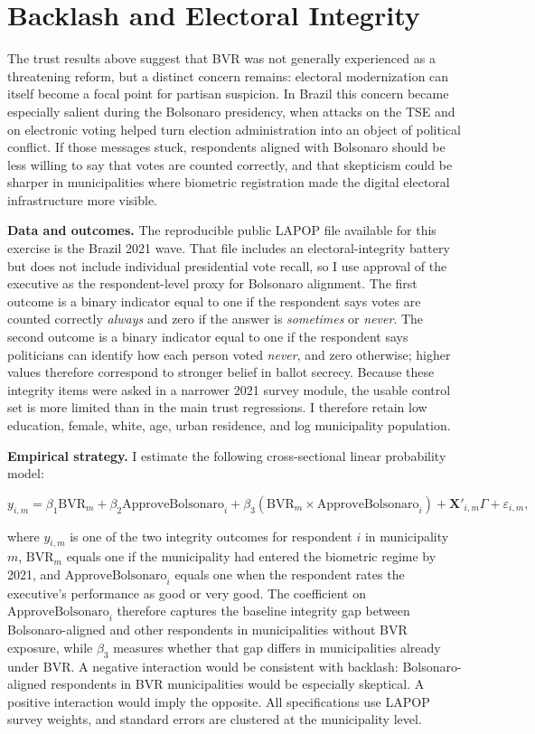 \section{Backlash and Electoral Integrity}

The trust results above suggest that BVR was not generally experienced as a threatening reform, but a distinct concern remains: electoral modernization can itself become a focal point for partisan suspicion. In Brazil this concern became especially salient during the Bolsonaro presidency, when attacks on the TSE and on electronic voting helped turn election administration into an object of political conflict. If those messages stuck, respondents aligned with Bolsonaro should be less willing to say that votes are counted correctly, and that skepticism could be sharper in municipalities where biometric registration made the digital electoral infrastructure more visible.

\textbf{Data and outcomes.} The reproducible public LAPOP file available for this exercise is the Brazil 2021 wave. That file includes an electoral-integrity battery but does not include individual presidential vote recall, so I use approval of the executive as the respondent-level proxy for Bolsonaro alignment. The first outcome is a binary indicator equal to one if the respondent says votes are counted correctly \emph{always} and zero if the answer is \emph{sometimes} or \emph{never}. The second outcome is a binary indicator equal to one if the respondent says politicians can identify how each person voted \emph{never}, and zero otherwise; higher values therefore correspond to stronger belief in ballot secrecy. Because these integrity items were asked in a narrower 2021 survey module, the usable control set is more limited than in the main trust regressions. I therefore retain low education, female, white, age, urban residence, and log municipality population.

\textbf{Empirical strategy.} I estimate the following cross-sectional linear probability model:

\begin{equation}
\label{eq:lapop-bvr-backlash}
y_{i,m} = \beta_1 \text{BVR}_m + \beta_2 \text{ApproveBolsonaro}_i + \beta_3 \left(\text{BVR}_m \times \text{ApproveBolsonaro}_i\right) + \mathbf{X}'_{i,m}\Gamma + \varepsilon_{i,m},
\end{equation}

where $y_{i,m}$ is one of the two integrity outcomes for respondent $i$ in municipality $m$, $\text{BVR}_m$ equals one if the municipality had entered the biometric regime by 2021, and $\text{ApproveBolsonaro}_i$ equals one when the respondent rates the executive's performance as good or very good. The coefficient on $\text{ApproveBolsonaro}_i$ therefore captures the baseline integrity gap between Bolsonaro-aligned and other respondents in municipalities without BVR exposure, while $\beta_3$ measures whether that gap differs in municipalities already under BVR. A negative interaction would be consistent with backlash: Bolsonaro-aligned respondents in BVR municipalities would be especially skeptical. A positive interaction would imply the opposite. All specifications use LAPOP survey weights, and standard errors are clustered at the municipality level.

